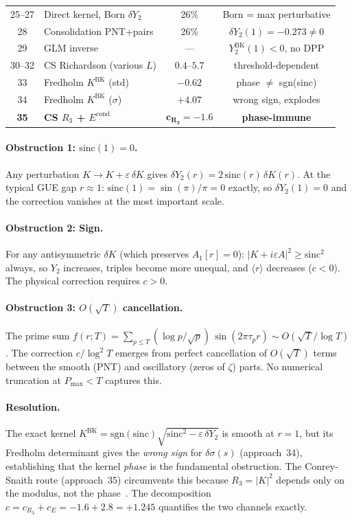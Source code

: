 \documentclass[10pt]{article}
\begin{document}
\begin{table}[H]
\begin{tabular}{clcc}
25--27 & Direct kernel, Born $\delta Y_2$ & 26\% & Born = max perturbative \\
28 & Consolidation PNT+pairs & 26\% & $\delta Y_2(1) = -0.273 \neq 0$ \\
29 & GLM inverse & --- & $Y_2^{\mathrm{BK}}(1) < 0$, no DPP \\
30--32 & CS Richardson (various $L$) & $0.4$--$5.7$ & threshold-dependent \\
33 & Fredholm $K^{\mathrm{BK}}$ (std) & $-0.62$ & phase $\neq$ sgn(sinc) \\
34 & Fredholm $K^{\mathrm{BK}}$ ($\sigma$) & $+4.07$ & wrong sign, explodes \\
\textbf{35} & \textbf{CS $R_3$ + $E^{\mathrm{cond}}$} & $\mathbf{c_{R_3} = -1.6}$ & \textbf{phase-immune} \\
\bottomrule
\end{tabular}
\end{table}

\paragraph{Obstruction 1: $\mathrm{sinc}(1) = 0$.}
Any perturbation $K \to K + \varepsilon\,\delta K$ gives
$\delta Y_2(r) = 2\,\mathrm{sinc}(r)\,\delta K(r)$.
At the typical GUE gap $r \approx 1$: $\mathrm{sinc}(1) = \sin(\pi)/\pi = 0$
exactly, so $\delta Y_2(1) = 0$ and the correction vanishes at the most
important scale.

\paragraph{Obstruction 2: Sign.}
For any antisymmetric $\delta K$ (which preserves $A_1[r] = 0$):
$|K + i\varepsilon A|^2 \geq \mathrm{sinc}^2$ always, so $Y_2$ increases,
triples become more unequal, and $\langle r\rangle$ decreases ($c < 0$).
The physical correction requires $c > 0$.

\paragraph{Obstruction 3: $O(\sqrt{T})$ cancellation.}
The prime sum $f(r; T) = \sum_{p \leq T} (\log p / \sqrt{p})\,\sin(2\pi\tau_p r)
\sim O(\sqrt{T}/\log T)$. The correction $c/\log^2 T$ emerges from perfect
cancellation of $O(\sqrt{T})$ terms between the smooth (PNT) and oscillatory
(zeros of $\zeta$) parts. No numerical truncation at $P_{\max} < T$ captures this.

\paragraph{Resolution.}
The exact kernel $K^{\mathrm{BK}} = \mathrm{sgn}(\mathrm{sinc})\sqrt{\mathrm{sinc}^2 - \varepsilon\,\delta Y_2}$
is smooth at $r = 1$, but its Fredholm determinant gives the \emph{wrong sign}
for $\delta\sigma(s)$ (approach~34), establishing that the kernel \emph{phase}
is the fundamental obstruction. The Conrey-Snaith route (approach~35) circumvents
this because $R_3 = |K|^2$ depends only on the modulus, not the phase~\cite{alarcon2026b}.
The decomposition $c = c_{R_3} + c_E = -1.6 + 2.8 = +1.245$ quantifies the
two channels exactly.
\end{document}
